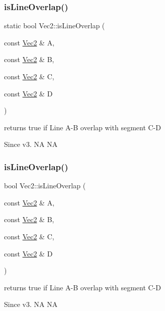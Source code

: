 \subsubsection{\texorpdfstring{is\+Line\+Overlap()}{isLineOverlap()}\hspace{0.1cm}{\footnotesize\ttfamily [1/2]}}
{\footnotesize\ttfamily static bool Vec2\+::is\+Line\+Overlap (\begin{DoxyParamCaption}\item[{const \hyperlink{classVec2}{Vec2} \&}]{A,  }\item[{const \hyperlink{classVec2}{Vec2} \&}]{B,  }\item[{const \hyperlink{classVec2}{Vec2} \&}]{C,  }\item[{const \hyperlink{classVec2}{Vec2} \&}]{D }\end{DoxyParamCaption})\hspace{0.3cm}{\ttfamily [static]}}

returns true if Line A-\/B overlap with segment C-\/D \begin{DoxySince}{Since}
v3.  NA  NA 
\end{DoxySince}
\mbox{\label{classVec2_a658e44470389d83f72cfdf5c91718605}} 
\subsubsection{\texorpdfstring{is\+Line\+Overlap()}{isLineOverlap()}\hspace{0.1cm}{\footnotesize\ttfamily [2/2]}}
{\footnotesize\ttfamily bool Vec2\+::is\+Line\+Overlap (\begin{DoxyParamCaption}\item[{const \hyperlink{classVec2}{Vec2} \&}]{A,  }\item[{const \hyperlink{classVec2}{Vec2} \&}]{B,  }\item[{const \hyperlink{classVec2}{Vec2} \&}]{C,  }\item[{const \hyperlink{classVec2}{Vec2} \&}]{D }\end{DoxyParamCaption})\hspace{0.3cm}{\ttfamily [static]}}

returns true if Line A-\/B overlap with segment C-\/D \begin{DoxySince}{Since}
v3.  NA  NA 
\end{DoxySince}
\mbox{\label{classVec2_ac526f6ebee4db5f43652b83a3c57ddc5}} 

